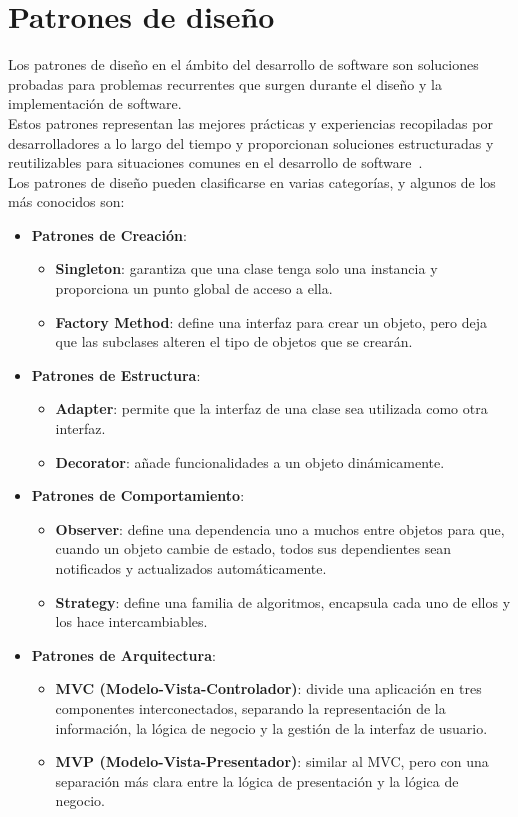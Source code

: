 \section{Patrones de diseño}
Los patrones de diseño en el ámbito del desarrollo de software 
son soluciones probadas para problemas recurrentes que surgen 
durante el diseño y la implementación de software.\\ 
Estos patrones representan las mejores prácticas y experiencias 
recopiladas por desarrolladores a lo largo del tiempo y 
proporcionan soluciones estructuradas y reutilizables 
para situaciones comunes en el desarrollo de software~\cite{fowler2012patterns}.\\
Los patrones de diseño pueden clasificarse en varias categorías, 
y algunos de los más conocidos son:
\begin{itemize}
	\item \textbf{Patrones de Creación}:
	\begin{itemize}
		\item \textbf{Singleton}: garantiza que una clase tenga solo una instancia y proporciona un punto global de acceso a ella.
		\item \textbf{Factory Method}: define una interfaz para crear un objeto, pero deja que las subclases alteren el tipo de objetos que se crearán.
	\end{itemize}
	\item \textbf{Patrones de Estructura}:
	\begin{itemize}
		\item \textbf{Adapter}: permite que la interfaz de una clase sea utilizada como otra interfaz.
		\item \textbf{Decorator}: añade funcionalidades a un objeto dinámicamente.
	\end{itemize}
	\item \textbf{Patrones de Comportamiento}:
	\begin{itemize}
		\item \textbf{Observer}: define una dependencia uno a muchos entre objetos para que, cuando un objeto cambie de estado, todos sus dependientes sean notificados y actualizados automáticamente.
		\item \textbf{Strategy}: define una familia de algoritmos, encapsula cada uno de ellos y los hace intercambiables.
	\end{itemize}
	\item \textbf{Patrones de Arquitectura}:
	\begin{itemize}
		\item \textbf{MVC (Modelo-Vista-Controlador)}: divide una aplicación en tres componentes interconectados, separando la representación de la información, la lógica de negocio y la gestión de la interfaz de usuario.
		\item \textbf{MVP (Modelo-Vista-Presentador)}: similar al MVC, pero con una separación más clara entre la lógica de presentación y la lógica de negocio.
	\end{itemize}
\end{itemize}

